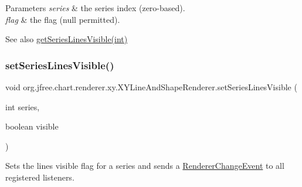 \begin{DoxyParams}{Parameters}
{\em series} & the series index (zero-\/based). \\
\hline
{\em flag} & the flag ({\ttfamily null} permitted).\\
\hline
\end{DoxyParams}
\begin{DoxySeeAlso}{See also}
\mbox{\hyperlink{classorg_1_1jfree_1_1chart_1_1renderer_1_1xy_1_1_x_y_line_and_shape_renderer_a12d61d772cadf4553c06817d8dab579a}{get\+Series\+Lines\+Visible(int)}} 
\end{DoxySeeAlso}
\mbox{\label{classorg_1_1jfree_1_1chart_1_1renderer_1_1xy_1_1_x_y_line_and_shape_renderer_aa414d34084cd31dc188eedd403179cc4}} 
\subsubsection{\texorpdfstring{set\+Series\+Lines\+Visible()}{setSeriesLinesVisible()}\hspace{0.1cm}{\footnotesize\ttfamily [2/2]}}
{\footnotesize\ttfamily void org.\+jfree.\+chart.\+renderer.\+xy.\+X\+Y\+Line\+And\+Shape\+Renderer.\+set\+Series\+Lines\+Visible (\begin{DoxyParamCaption}\item[{int}]{series,  }\item[{boolean}]{visible }\end{DoxyParamCaption})}

Sets the \textquotesingle{}lines visible\textquotesingle{} flag for a series and sends a \mbox{\hyperlink{}{Renderer\+Change\+Event}} to all registered listeners.


